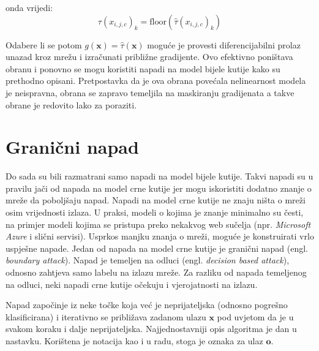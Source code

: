 \documentclass[utf8, diplomski]{fer}
\begin{document}
onda vrijedi:
\begin{equation}
	\tau (x_{i, j, c})_{k} = \text{floor}(\hat{\tau}(x_{i,j,c})_{k})
\end{equation}

Odabere li se potom $g(\boldsymbol{x}) = \hat{\tau}(\boldsymbol{x})$ moguće je provesti diferencijabilni prolaz unazad kroz mrežu i izračunati približne gradijente. Ovo efektivno poništava obranu i ponovno se mogu koristiti napadi na model bijele kutije kako su prethodno opisani. Pretpostavka da je ova obrana povećala nelinearnost modela je neispravna, obrana se zapravo temeljila na maskiranju gradijenata a takve obrane je redovito lako za poraziti.

\section{Granični napad}\label{boundary_att} Do sada su bili razmatrani samo napadi na model bijele kutije. Takvi napadi su u pravilu jači od napada na model crne kutije jer mogu iskoristiti dodatno znanje o mreže da poboljšaju napad. Napadi na model crne kutije ne znaju ništa o mreži osim vrijednosti izlaza. U praksi, modeli o kojima je znanje minimalno su česti, na primjer modeli kojima se pristupa preko nekakvog web sučelja (npr. \textit{Microsoft Azure} i slični servisi). Usprkos manjku znanja o mreži, moguće je konstruirati vrlo uspješne napade.
Jedan od napada na model crne kutije je granični napad (engl. \textit{boundary attack}). Napad je temeljen na odluci (engl. \textit{decision based attack}), odnosno zahtjeva samo labelu na izlazu mreže. Za razliku od napada temeljenog na odluci, neki napadi crne kutije očekuju i vjerojatnosti na izlazu. \par
Napad započinje iz neke točke koja već je neprijateljska (odnosno pogrešno klasificirana) i iterativno se približava zadanom ulazu $\boldsymbol{x}$ pod uvjetom da je u svakom koraku i dalje neprijateljska. Najjednostavniji opis algoritma je dan u nastavku. Korištena je notacija kao i u radu, stoga je oznaka za ulaz $\boldsymbol{o}$.
\end{document}
